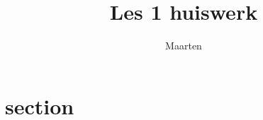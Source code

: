 \documentclass[12pt,a4paper]{article}
\title{Les 1 huiswerk}
\author{Maarten}
\begin{document}
\maketitle

\section{section}
\end{document}
